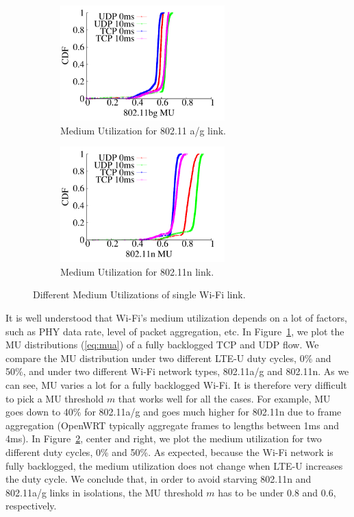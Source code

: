 \begin{figure}[t] \centering
    \begin{subfigure}[b]{\linewidth} \centering
     \includegraphics[width=2.5in, angle=0]{./figures/csat_mu_80211bg} 
         \vspace{-0.0cm}
         \caption{Medium Utilization for 802.11 a/g link.}         
        \label{fig:mu_examples_ag}
    \end{subfigure} %

    \begin{subfigure}[b]{\linewidth} \centering 
     \includegraphics[width=2.5in, angle=0]{./figures/csat_mu_80211n}  
        \vspace{-0.0cm}
        \caption{Medium Utilization for 802.11n link.}
        \label{fig:mu_examples_n}    
    \end{subfigure} 
\caption{Different Medium Utilizations of single Wi-Fi link.}
\label{mu_examples}
\vspace{-0.2cm}
\end{figure}




It is well understood that Wi-Fi's medium utilization depends on a lot of factors, such as PHY data rate, level of packet aggregation, etc. In Figure~\ref{fig:mu_examples_ag}, we plot the MU distributions (\ref{eq:mua}) of a fully backlogged TCP and UDP flow. 
We compare the MU distribution under two different LTE-U duty cycles, 0\% and 50\%, 
and under two different Wi-Fi network types, 802.11a/g and 802.11n.
As we can see, MU varies a lot for a fully backlogged Wi-Fi.
It is therefore very difficult to pick a MU threshold $m$ that works well for all the cases. 
For example, MU goes down to 40\% for 802.11a/g and goes much higher for 802.11n
due to frame aggregation (OpenWRT typically aggregate frames to lengths between 1ms and 4ms).
In Figure~\ref{fig:mu_examples_n}, center and right, we plot the medium utilization for two different duty cycles, 0\% and 50\%. 
As expected, because the Wi-Fi network is fully backlogged, the medium utilization does not change when LTE-U increases the duty cycle. 
We conclude that, in order to avoid starving 802.11n and 802.11a/g links in isolations, 
the MU threshold $m$ has to be under 0.8 and 0.6, respectively. 




